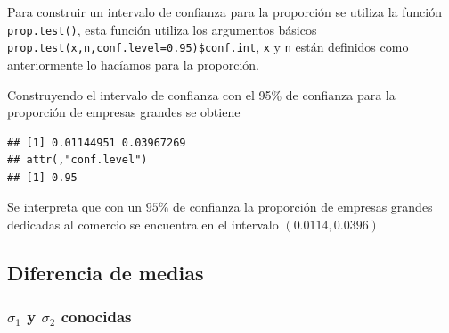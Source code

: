 \documentclass[letterpaper,]{book}
\newenvironment{Shaded}{\begin{snugshade}}{\end{snugshade}}
\newcommand{\DataTypeTok}[1]{\textcolor[rgb]{0.13,0.29,0.53}{#1}}
\newcommand{\KeywordTok}[1]{\textcolor[rgb]{0.13,0.29,0.53}{\textbf{#1}}}
\newcommand{\NormalTok}[1]{#1}
\newcommand{\OperatorTok}[1]{\textcolor[rgb]{0.81,0.36,0.00}{\textbf{#1}}}
\newcommand{\OtherTok}[1]{\textcolor[rgb]{0.56,0.35,0.01}{#1}}
\newcommand{\StringTok}[1]{\textcolor[rgb]{0.31,0.60,0.02}{#1}}
\begin{document}
\begin{Shaded}
\end{Shaded}

Para construir un intervalo de confianza para la proporción se utiliza la función \texttt{prop.test()}, esta función utiliza los argumentos básicos \texttt{prop.test(x,n,conf.level=0.95)\$conf.int}, \texttt{x} y \texttt{n} están definidos como anteriormente lo hacíamos para la proporción.

Construyendo el intervalo de confianza con el 95\% de confianza para la proporción de empresas grandes se obtiene

\begin{Shaded}
\end{Shaded}

\begin{verbatim}
## [1] 0.01144951 0.03967269
## attr(,"conf.level")
## [1] 0.95
\end{verbatim}

Se interpreta que con un \(95\%\) de confianza la proporción de empresas grandes dedicadas al comercio se encuentra en el intervalo \(\left(0.0114, 0.0396 \right)\)

\hypertarget{diferencia-de-medias}{%
\subsection{Diferencia de medias}\label{diferencia-de-medias}}

\hypertarget{sigma_1-y-sigma_2-conocidas}{%
\subsubsection{\texorpdfstring{\(\sigma_1\) y \(\sigma_2\) conocidas}{\textbackslash{}sigma\_1 y \textbackslash{}sigma\_2 conocidas}}\label{sigma_1-y-sigma_2-conocidas}}
\end{document}
